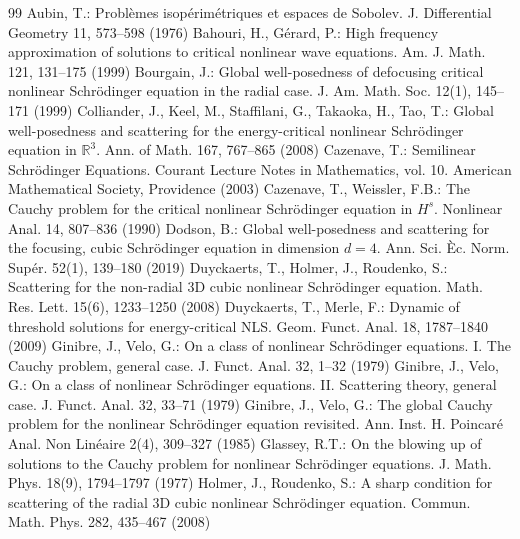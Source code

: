 \documentclass[10pt,a4paper]{amsart}
\numberwithin{equation}{section}
\begin{document}
\begin{thebibliography}{99}
 Aubin, T.: Probl\`emes isop\'erim\'etriques et espaces de Sobolev. J. Differential Geometry 11, 573--598 (1976)
 Bahouri, H., G\'erard, P.: High frequency approximation of solutions to critical nonlinear wave equations. Am. J. Math. 121, 131--175 (1999)
 Bourgain, J.: Global well-posedness of defocusing critical nonlinear Schr\"odinger equation in the radial case. J. Am. Math. Soc. 12(1), 145--171 (1999)
 Colliander, J., Keel, M., Staffilani, G., Takaoka, H., Tao, T.: Global well-posedness and scattering for the energy-critical nonlinear Schr\"odinger equation in $\mathbb R^3$. Ann. of Math. 167, 767--865 (2008)
 Cazenave, T.: Semilinear Schr\"odinger Equations. Courant Lecture Notes in Mathematics, vol. 10. American Mathematical Society, Providence (2003)
 Cazenave, T., Weissler, F.B.: The Cauchy problem for the critical nonlinear Schr\"odinger equation in $H^s$. Nonlinear Anal. 14, 807--836 (1990)
 Dodson, B.: Global well-posedness and scattering for the focusing, cubic Schr\"odinger equation in dimension $d=4$. Ann. Sci. \`Ec. Norm. Sup\'er. 52(1), 139--180 (2019)
 Duyckaerts, T., Holmer, J., Roudenko, S.: Scattering for the non-radial 3D cubic nonlinear Schr\"odinger equation. Math. Res. Lett. 15(6), 1233--1250 (2008)
 Duyckaerts, T., Merle, F.: Dynamic of threshold solutions for energy-critical NLS. Geom. Funct. Anal. 18, 1787--1840 (2009)
 Ginibre, J., Velo, G.: On a class of nonlinear Schr\"odinger equations. I. The Cauchy problem, general case. J. Funct. Anal. 32, 1--32 (1979)
 Ginibre, J., Velo, G.: On a class of nonlinear Schr\"odinger equations. II. Scattering theory, general case. J. Funct. Anal. 32, 33--71 (1979)
 Ginibre, J., Velo, G.: The global Cauchy problem for the nonlinear Schr\"odinger equation revisited. Ann. Inst. H. Poincar\'e Anal. Non Lin\'eaire 2(4), 309--327 (1985)
 Glassey, R.T.: On the blowing up of solutions to the Cauchy problem for nonlinear Schr\"odinger equations. J. Math. Phys. 18(9), 1794--1797 (1977)
 Holmer, J., Roudenko, S.: A sharp condition for scattering of the radial 3D cubic nonlinear Schr\"odinger equation. Commun. Math. Phys. 282, 435--467 (2008)

\end{thebibliography}
\end{document}
